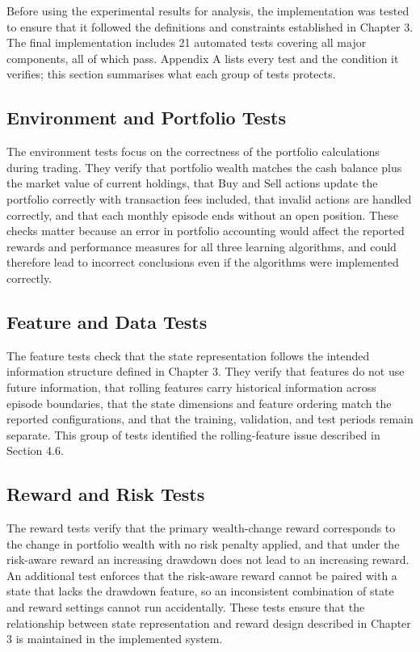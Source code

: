 Before using the experimental results for analysis, the implementation
was tested to ensure that it followed the definitions and constraints
established in Chapter 3. The final implementation includes 21 automated
tests covering all major components, all of which pass. Appendix A lists
every test and the condition it verifies; this section summarises what
each group of tests protects.

\subsection{Environment and Portfolio Tests}

The environment tests focus on the correctness of the portfolio
calculations during trading. They verify that portfolio wealth matches
the cash balance plus the market value of current holdings, that Buy and
Sell actions update the portfolio correctly with transaction fees
included, that invalid actions are handled correctly, and that each
monthly episode ends without an open position. These checks matter
because an error in portfolio accounting would affect the reported
rewards and performance measures for all three learning algorithms, and
could therefore lead to incorrect conclusions even if the algorithms
were implemented correctly.

\subsection{Feature and Data Tests}

The feature tests check that the state representation follows the
intended information structure defined in Chapter 3. They verify that
features do not use future information, that rolling features carry
historical information across episode boundaries, that the state
dimensions and feature ordering match the reported configurations, and
that the training, validation, and test periods remain separate. This
group of tests identified the rolling-feature issue described in
Section 4.6.

\subsection{Reward and Risk Tests}

The reward tests verify that the primary wealth-change reward
corresponds to the change in portfolio wealth with no risk penalty
applied, and that under the risk-aware reward an increasing drawdown
does not lead to an increasing reward. An additional test enforces that
the risk-aware reward cannot be paired with a state that lacks the
drawdown feature, so an inconsistent combination of state and reward
settings cannot run accidentally. These tests ensure that the
relationship between state representation and reward design described in
Chapter 3 is maintained in the implemented system.

